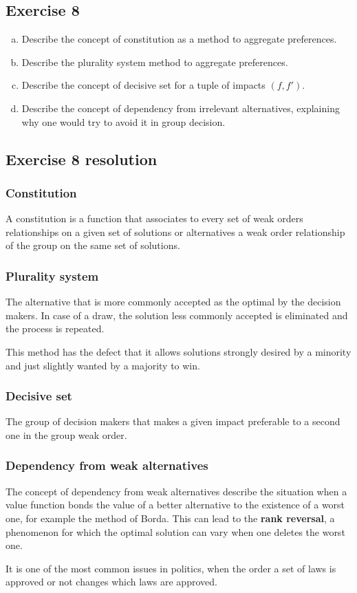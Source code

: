 \documentclass[\main/main.tex]{subfiles}
\begin{document}
\subsection{Exercise 8}
\begin{enumerate}[a)]
	\item Describe the concept of constitution as a method to aggregate preferences.
	\item Describe the plurality system method to aggregate preferences.
	\item Describe the concept of decisive set for a tuple of impacts $(f, f')$.
	\item Describe the concept of dependency from irrelevant alternatives, explaining why one would try to avoid it in group decision.
\end{enumerate}

\subsection{Exercise 8 resolution}
\subsubsection*{Constitution}
A constitution is a function that associates to every set of weak orders relationships on a given set of solutions or alternatives a weak order relationship of the group on the same set of solutions.

\subsubsection*{Plurality system}
The alternative that is more commonly accepted as the optimal by the decision makers. In case of a draw, the solution less commonly accepted is eliminated and the process is repeated.

This method has the defect that it allows solutions strongly desired by a minority and just slightly wanted by a majority to win.

\subsubsection*{Decisive set}
The group of decision makers that makes a given impact preferable to a second one in the group weak order.

\subsubsection*{Dependency from weak alternatives}
The concept of dependency from weak alternatives describe the situation when a value function bonds the value of a better alternative to the existence of a worst one, for example the method of Borda. This can lead to the \textbf{rank reversal}, a phenomenon for which the optimal solution can vary when one deletes the worst one.

It is one of the most common issues in politics, when the order a set of laws is approved or not changes which laws are approved.
\end{document}
